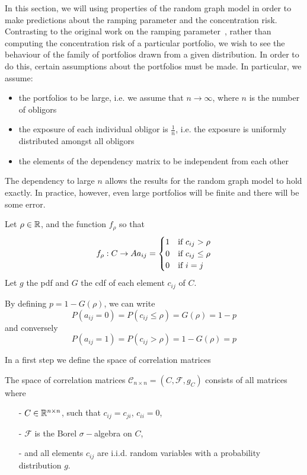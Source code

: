 In this section, we will using properties of the random graph model in order to make predictions about the ramping parameter and the concentration risk.
Contrasting to the original work on the ramping parameter~\cite{Sindel:2009vd}, rather than computing the concentration risk of a particular portfolio, we wish to see the behaviour of the family of portfolios drawn from a given distribution.
In order to do this, certain assumptions about the portfolios must be made.
In particular, we assume:
\begin{itemize}
	\item the portfolios to be large, i.e. we assume that $n \rightarrow \infty$, where $n$ is the number of obligors
	\item the exposure of each individual obligor is $\frac{1}{n}$, i.e. the exposure is uniformly distributed amongst all obligors
	\item the elements of the dependency matrix to be independent from each other
\end{itemize}

\begin{remark}The dependency to large $n$ allows the results for the random graph model to hold exactly.
In practice, however, even large portfolios will be finite and there will be some error.
\end{remark}




\begin{definition}
\label{def:equivalence_aux} 
Let $\rho \in {\mathbb R}$, and the function $f_\rho$ so that
\begin{equation}
\label{eqn:function}
f_\rho: C \rightarrow A\\
\\
a_{ij} = \begin{cases} 1 & \text{if } c_{ij} > \rho \\
                       0 & \text{if } c_{ij} \le \rho \\
                       0 & \text{if } i = j
        \end{cases}
\end{equation}
Let $g$ the pdf and $G$ the cdf of each element $c_{ij}$ of $C$.

By defining $p = 1-G(\rho)$, we can write
$$
P( a_{ij} = 0 ) = P(c_{ij} \le \rho) = G(\rho) = 1-p
$$
and conversely
$$
P( a_{ij} = 1 ) = P(c_{ij} > \rho) = 1 - G(\rho) = p
$$
\end{definition}

In a first step we define the space of correlation matrices 
\begin{definition}
The space of correlation matrices $\mathcal{C}_{n\times n} = \left( C, \mathcal{F},  g_C \right)$ consists of all matrices where
\begin{itemize}
\item[-] $C \in {\mathbb R}^{n \times n}$, such that $c_{ij} = c_{ji}$, $c_{ii} = 0$, 
\item[-] $\mathcal{F}$ is the Borel $\sigma-$algebra on $C$,
\item[-] and all elements $c_{ij}$ are i.i.d. random variables with a probability distribution $g$.
\end{itemize}
\end{definition}

